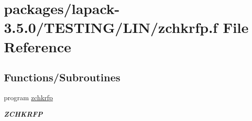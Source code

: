 \hypertarget{zchkrfp_8f}{}\section{packages/lapack-\/3.5.0/\+T\+E\+S\+T\+I\+N\+G/\+L\+I\+N/zchkrfp.f File Reference}
\label{zchkrfp_8f}
\subsection*{Functions/\+Subroutines}
\begin{DoxyCompactItemize}
\item 
program \hyperlink{group__complex16__lin_gae8035dbdfd107d0b59a175bdfa9b5186}{zchkrfp}
\begin{DoxyCompactList}\small\item\em {\bfseries Z\+C\+H\+K\+R\+F\+P} \end{DoxyCompactList}\end{DoxyCompactItemize}
